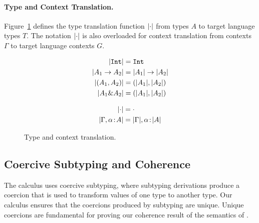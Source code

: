 \paragraph{Type and Context Translation.}

Figure~\ref{fig:type-and-context-translation} defines the type translation
function $\lvert \cdot \rvert$ from \name types $A$ to target language types $T$. The
notation $\lvert \cdot \rvert$ is also overloaded for context translation from \name
contexts $\Gamma$ to target language contexts $G$.

\begin{figure}[t]

  \begin{align*}
    \lvert \texttt{Int} \rvert        &= \texttt{Int} \\
    \lvert A_1 \to A_2 \rvert       &= \lvert A_1 \rvert \to \lvert A_2 \rvert \\
    \lvert (A_1, A_2) \rvert &= (\lvert A_1 \rvert, \lvert A_2 \rvert) \\
    \lvert A_1 \& A_2 \rvert    &= (\lvert A_1 \rvert, \lvert A_2 \rvert) \\
  \end{align*}


  \begin{align*}
    \lvert \cdot \rvert                      &= \cdot \\
    \lvert \Gamma, \alpha \!:\! A \rvert &= \lvert \Gamma \rvert, \alpha \!:\! \lvert A \rvert
  \end{align*}

  \caption{Type and context translation.}
  \label{fig:type-and-context-translation}
\end{figure}



\subsection{Coercive Subtyping and Coherence} 
The \name calculus uses coercive subtyping, where subtyping
derivations produce a coercion that is used to transform values of one
type to another type. 
Our calculus ensures that the coercions produced
by subtyping are unique. Unique coercions are fundamental for proving 
our coherence result of the semantics of \name.


